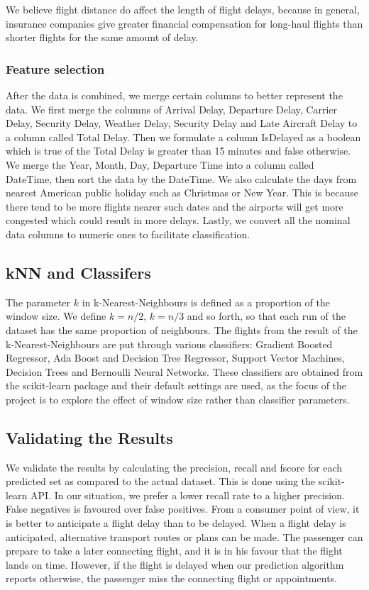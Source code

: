 \documentclass[letterpaper,11pt]{article}
\begin{document}
We believe flight distance do affect the length of flight delays, because in general, insurance companies give greater financial compensation for long-haul flights than shorter flights for the same amount of delay.

\subsubsection{Feature selection}
After the data is combined, we merge certain columns to better represent the data. We first merge the columns of Arrival Delay, Departure Delay, Carrier Delay, Security Delay, Weather Delay, Security Delay and Late Aircraft Delay to a column called Total Delay. Then we formulate a column IsDelayed as a boolean which is true of the Total Delay is greater than 15 minutes and false otherwise. We merge the Year, Month, Day, Departure Time into a column called DateTime, then sort the data by the DateTime. We also calculate the days from nearest American public holiday such as Christmas or New Year. This is because there tend to be more flights nearer such dates and the airports will get more congested which could result in more delays. Lastly, we convert all the nominal data columns to numeric ones to facilitate classification. 

\subsection{kNN and Classifers}
The parameter $k$ in k-Nearest-Neighbours is defined as a proportion of the window size. We define $k=n/2$, $k=n/3$ and so forth, so that each run of the dataset has the same proportion of neighbours. 	
The flights from the result of the k-Nearest-Neighbours are put through various classifiers: Gradient Boosted Regressor, Ada Boost and Decision Tree Regressor, Support Vector Machines, Decision Trees and Bernoulli Neural Networks. These classifiers are obtained from the scikit-learn package and their default settings are used, as the focus of the project is to explore the effect of window size rather than classifier parameters. 

\subsection{Validating the Results}
We validate the results by calculating the precision, recall and fscore for each predicted set as compared to the actual dataset. This is done using the scikit-learn API. In our situation, we prefer a lower recall rate to a higher precision. False negatives is favoured over false positives. From a consumer point of view, it is better to anticipate a flight delay than to be delayed. When a flight delay is anticipated, alternative transport routes or plans can be made. The passenger can prepare to take a later connecting flight, and it is in his favour that the flight lands on time. However, if the flight is delayed when our prediction algorithm reports otherwise, the passenger miss the connecting flight or  appointments. 
\end{document}
